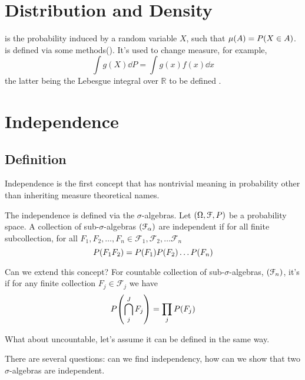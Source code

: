\section{Distribution and Density}

 is the probability induced by a random variable \(X\), such that \(\mu(A) = P\pqty{X \in A}\).  is defined via some methods(). It's used to change measure, for example,
\begin{equation*}
    \int g(X) \dd{P} = \int g(x)f(x)\dd{x}
\end{equation*}
the latter being the Lebesgue integral over \(\mathbb{R}\) to be defined .

\section{Independence}

\subsection{Definition}

Independence is the first concept that has nontrivial meaning in probability other than inheriting measure theoretical names. 

The independence is defined via the \(\sigma\)-algebras. Let \(\pqty{\Omega, \mathcal{F}, P}\) be a probability space. A collection of sub-\(\sigma\)-algebras \(\pqty{\mathcal{F}_{\alpha}}\) are independent if for all finite subcollection, for all \(F_{1}, F_{2}, \dots, F_{n} \in\mathcal{F}_{1}, \mathcal{F}_{2}, \dots \mathcal{F}_{n}\)
\begin{equation*}
    P\pqty{F_{1} F_{2}} = P(F_{1}) P(F_{2}) \dots P \pqty{F_{n}}
\end{equation*}

Can we extend this concept? For countable collection of sub-\(\sigma\)-algebras, \(\pqty{\mathcal{F}_{n}}\), it's  if for any finite collection \(F_{j} \in \mathcal{F}_{j}\) we have 
\begin{equation*}
    P\pqty{\bigcap_{j}^{J} F_{j}} = \prod_{j} P \pqty{F_{j}}
\end{equation*}

What about uncountable, let's assume it can be defined in the same way. 

There are several questions: can we find independency, how can we show that two \(\sigma\)-algebras are independent. 

